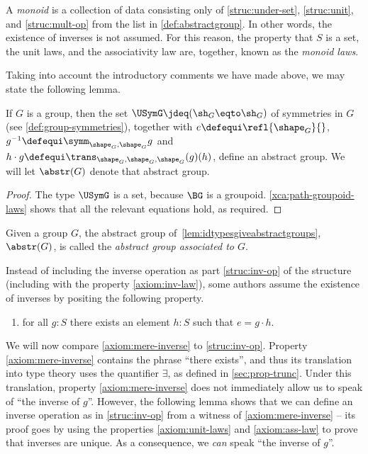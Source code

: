 \begin{remark}\label{rem:monoids}
  A \emph{monoid} is a collection of data consisting only of \ref{struc:under-set}, \ref{struc:unit}, and \ref{struc:mult-op} from the list in
  \cref{def:abstractgroup}.  In other words, the existence of inverses is not assumed.  For this reason, the property that $S$ is a set, the
  unit laws, and the associativity law are, together, known as the \emph{monoid laws}.
\end{remark}

Taking into account the introductory comments we have made above, we may state the following lemma.

\begin{lemma}\label{lem:idtypesgiveabstractgroups}
  If $G$ is a group, then the set $\USymG \jdeq (\sh_G\eqto\sh_G)$
  of symmetries in $G$ (see \cref{def:group-symmetries}),
  together with $e\defequi\refl{\shape_G}{}$,
  $g^{-1}\defequi\symm_{\shape_G,\shape_G}g$
  and $h \cdot g \defequi \trans_{\shape_G,\shape_G,\shape_G}(g)(h)$, define an abstract group.
  We will let $\abstr(G)$ denote that abstract group.
\end{lemma}

\begin{proof}
  The type $\USymG$ is a set, because $\BG$ is a groupoid.
  \cref{xca:path-groupoid-laws} shows that all the relevant equations hold, as required.
\end{proof}

\begin{definition}\label{def:abstrG}
  Given a group $G$, the abstract group of~\cref{lem:idtypesgiveabstractgroups},
  $\abstr(G)$, is called the \emph{abstract group associated to $G$}.
\end{definition}

\begin{remark}\label{rem:inverses-as-property}
  Instead of including the inverse operation as part
  \ref{struc:inv-op} of the structure (including with the property
  \ref{axiom:inv-law}), some authors assume the existence of inverses
  by positing the following property.
  \begin{enumerate}[start=5]
    \item\label{axiom:mere-inverse} for all $g:S$ there exists an element
    $h:S$ such that $e = g \cdot h$.
  \end{enumerate}

  We will now compare \ref{axiom:mere-inverse} to \ref{struc:inv-op}.
  Property \ref{axiom:mere-inverse} contains the phrase ``there exists'', and thus its translation into type theory
  uses the quantifier $\exists$, as defined in \cref{sec:prop-trunc}.  Under this translation, property \ref{axiom:mere-inverse} does
  not immediately allow us to speak of ``the inverse of $g$''.
  However, the following lemma shows that we can define an inverse operation as in \ref{struc:inv-op} from a witness of \ref{axiom:mere-inverse}
  -- its proof goes by using the properties \ref{axiom:unit-laws} and \ref{axiom:ass-law} to prove that inverses are unique.  As a consequence,
  we \emph{can} speak ``the inverse of $g$''.
\end{remark}

